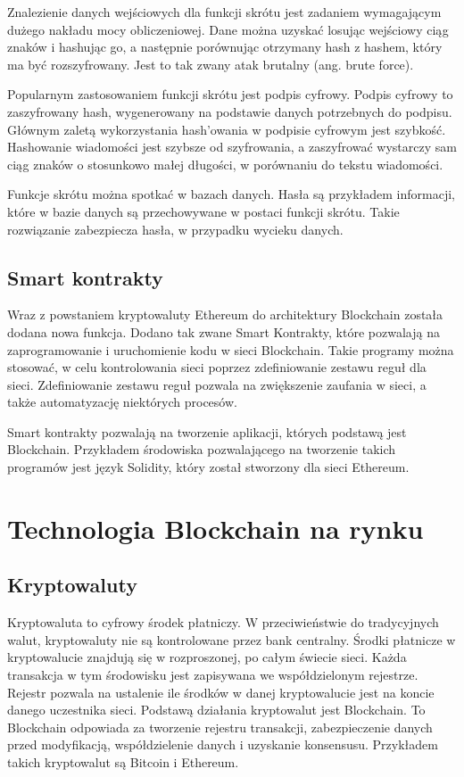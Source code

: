 \documentclass[a4paper,12pt]{book}
\begin{document}
Znalezienie danych wejściowych dla funkcji skrótu jest zadaniem wymagającym dużego nakładu mocy obliczeniowej. Dane można uzyskać losując wejściowy ciąg znaków i hashując go, a następnie porównując otrzymany hash z hashem, który ma być rozszyfrowany. Jest to tak zwany atak brutalny (ang. brute force).

Popularnym zastosowaniem funkcji skrótu jest podpis cyfrowy. Podpis cyfrowy to zaszyfrowany hash, wygenerowany na podstawie danych potrzebnych do podpisu. Głównym zaletą wykorzystania hash'owania w podpisie cyfrowym jest szybkość. Hashowanie wiadomości jest szybsze od szyfrowania, a zaszyfrować wystarczy sam ciąg znaków o stosunkowo małej długości, w porównaniu do tekstu wiadomości.

Funkcje skrótu można spotkać w bazach danych. Hasła są przykładem informacji, które w bazie danych są przechowywane w postaci funkcji skrótu. Takie rozwiązanie zabezpiecza hasła, w przypadku wycieku danych.

\subsection{Smart kontrakty}

Wraz z powstaniem kryptowaluty Ethereum do architektury Blockchain została dodana nowa funkcja. Dodano tak zwane Smart Kontrakty, które pozwalają na zaprogramowanie i uruchomienie kodu w sieci Blockchain. Takie programy można stosować, w celu kontrolowania sieci poprzez zdefiniowanie zestawu reguł dla sieci. Zdefiniowanie zestawu reguł pozwala na zwiększenie zaufania w sieci, a także automatyzację niektórych procesów.

Smart kontrakty pozwalają na tworzenie aplikacji, których podstawą jest Blockchain. Przykładem środowiska pozwalającego na tworzenie takich programów jest język Solidity, który został stworzony dla sieci Ethereum\cite{smart-contract}. 

\newpage

\section{Technologia Blockchain na rynku}

\subsection{Kryptowaluty}

Kryptowaluta to cyfrowy środek płatniczy. W przeciwieństwie do tradycyjnych walut, kryptowaluty nie są kontrolowane przez bank centralny. Środki płatnicze w kryptowalucie znajdują się w rozproszonej, po całym świecie sieci. Każda transakcja w tym środowisku jest zapisywana we współdzielonym rejestrze. Rejestr pozwala na ustalenie ile środków w danej kryptowalucie jest na koncie danego uczestnika sieci. Podstawą działania kryptowalut jest Blockchain. To Blockchain odpowiada za tworzenie rejestru transakcji, zabezpieczenie danych przed modyfikacją, współdzielenie danych i uzyskanie konsensusu. Przykładem takich kryptowalut są Bitcoin i Ethereum.
\end{document}
